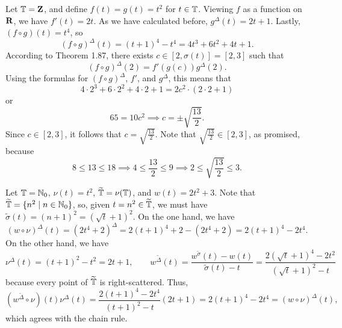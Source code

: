 \documentclass[nonumber]{homework}
\begin{document}
	\maketitle
	
	 Let $\mathbb{T} = \textbf{Z}$, and define $f(t) = g(t) = t^2$ for $t \in \mathbb{T}$. Viewing $f$ as a function on $\textnormal{\bf R}$, we have $f'(t) = 2t$. As we have calculated before, $g^\Delta(t) = 2t + 1$. Lastly, $(f \circ g)(t) = t^4$, so
	\begin{equation*}
		(f\circ g)^\Delta(t) = (t+1)^4 - t^4 = 4t^3 + 6t^2 + 4t + 1.
	\end{equation*}
	According to Theorem 1.87, there exists $c \in [2, \sigma(t)] = [2, 3]$ such that
	\begin{equation*}
		(f\circ g)^\Delta(2) = f'(g(c))g^\Delta(2).
	\end{equation*}
	Using the formulas for $(f\circ g)^\Delta$, $f'$, and $g^\Delta$, this means that
	\begin{equation*}
		4\cdot 2^3 + 6\cdot 2^2 + 4\cdot 2 + 1 = 2c^2\cdot (2\cdot 2 + 1)
	\end{equation*}
	or
	\begin{equation*}
		65 = 10c^2 \implies c = \pm \sqrt{\frac{13}{2}}.
	\end{equation*}
	Since $c \in [2,3]$, it follows that $c = \sqrt{\frac{13}{2}}$. Note that $\sqrt{\frac{13}{2}} \in [2,3]$, as promised, because
	\begin{equation*}
		8 \le 13 \le 18 \implies 4 \le \frac{13}{2} \le 9 \implies 2 \le \sqrt{\frac{13}{2}} \le 3.
	\end{equation*}
	
	\newcommand{\tst}{\widetilde{\ts}}
	\newcommand{\sigmat}{\widetilde{\sigma}}
	 Let $\mathbb{T} = \mathbb{N}_0$, $\nu(t) = t^2$, $\tst = \nu(\ts)$, and $w(t) = 2t^2 + 3$. Note that $\tst = \{n^2 \mid n \in \N_0\}$, so, given $t = n^2 \in \tst$, we must have $\sigmat(t) = (n+1)^2 = (\sqrt{t} + 1)^2$. On the one hand, we have
	\begin{equation*}
		(w \circ \nu)^\Delta(t) = (2t^4 + 2)^\Delta = 2(t+1)^4 + 2 - (2t^4  +2) = 2(t+1)^4 - 2t^4.
	\end{equation*}
	On the other hand, we have
	\begin{equation*}
		\nu^\Delta(t) = (t+1)^2 - t^2 = 2t + 1, \qquad w^{\widetilde{\Delta}}(t) = \frac{w^{\sigmat}(t) - w(t)}{\sigmat(t) - t} = \frac{2(\sqrt{t} + 1)^4 - 2t^2}{(\sqrt{t} + 1)^2 - t}
	\end{equation*}
	because every point of $\tst$ is right-scattered. Thus,
	\begin{equation*}
		\left(w^{\widetilde{\Delta}}\circ \nu\right)(t)\nu^\Delta(t) = \frac{2(t + 1)^4 - 2t^4}{(t+1)^2 - t}(2t+1) = 2(t+1)^4 - 2t^4 = (w\circ\nu)^\Delta(t),
	\end{equation*}
	which agrees with the chain rule.
	
\end{document}
